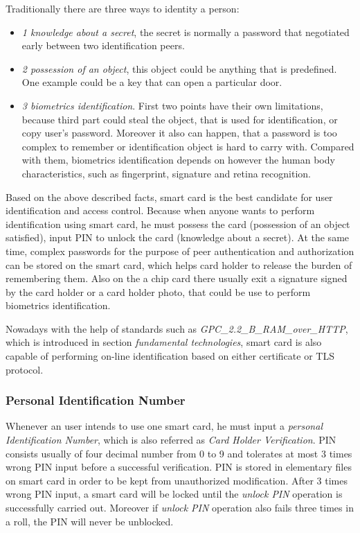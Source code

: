 Traditionally there are three ways to identity a person\cite{handbuch}:
\begin{itemize}
\item \emph{1 knowledge about a secret}, the secret is normally a password that negotiated early between two identification peers.
\item \emph{2 possession of an object}, this object could be anything that is predefined. One example could be a key that can open a particular door.
\item \emph{3 biometrics identification}. First two points have their own limitations, because third part could steal the object, that is used for identification, or copy user's password. Moreover it also can happen, that a password is too complex to remember or identification object is hard to carry with. Compared with them, biometrics identification depends on however the human body characteristics, such as fingerprint, signature and retina recognition.
\end{itemize}
Based on the above described facts, smart card is the best candidate for user identification and access control. Because when anyone wants to perform identification using smart card, he must possess the card (possession of an object satisfied), input PIN to unlock the card (knowledge about a secret). At the same time, complex passwords for the purpose of peer authentication and authorization can be stored on the smart card, which helps card holder to release the burden of remembering them. Also on the a chip card there usually exit a signature signed by the card holder or a card holder photo, that could be use to perform biometrics identification. 

Nowadays with the help of standards such as \emph{GPC\_2.2\_B\_RAM\_over\_HTTP}, which is introduced in section \emph{fundamental technologies}, smart card is also capable of performing on-line identification based on either certificate or TLS protocol.

\subsubsection{Personal Identification Number}
Whenever an user intends to use one smart card, he must input a \emph{personal Identification Number}, which is also referred as \emph{Card Holder Verification}. PIN consists usually of four decimal number from 0 to 9 and tolerates at most 3 times wrong PIN input before a successful verification. PIN is stored in elementary files\cite{smart_card_access} on smart card in order to be kept from unauthorized modification. After 3 times wrong PIN input, a smart card will be locked until the \emph{unlock PIN} operation is successfully carried out. Moreover if \emph{unlock PIN} operation also fails three times in a roll, the PIN will never be unblocked\cite{smart_card_access}.

